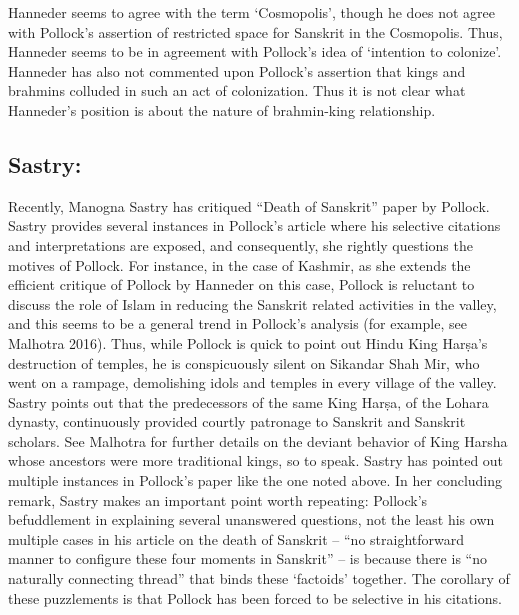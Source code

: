Hanneder seems to agree with the term ‘Cosmopolis’, though he does not agree with Pollock’s assertion of restricted space for Sanskrit in the Cosmopolis. Thus, Hanneder seems to be in agreement with Pollock’s idea of ‘intention to colonize’. Hanneder has also not commented upon Pollock’s assertion that kings and brahmins colluded in such an act of colonization. Thus it is not clear what Hanneder’s position is about the nature of brahmin-king relationship.


\newpage

\subsection*{Sastry:}

\vspace{-.3cm}

Recently, Manogna Sastry has critiqued “Death of Sanskrit” paper by Pollock. Sastry provides several instances in Pollock’s article where his selective citations and interpretations are exposed, and consequently, she rightly questions the motives of Pollock. For instance, in the case of Kashmir, as she extends the efficient critique of Pollock by Hanneder on this case, Pollock is reluctant to discuss the role of Islam in reducing the Sanskrit related activities in the valley, and this seems to be a general trend in Pollock’s analysis (for example, see Malhotra 2016). Thus, while Pollock is quick to point out Hindu King Harṣa’s destruction of temples, he is conspicuously silent on Sikandar Shah Mir, who went on a rampage, demolishing idols and temples in every village of the valley. Sastry points out that the predecessors of the same King Harṣa, of the Lohara dynasty, continuously provided courtly patronage to Sanskrit and Sanskrit scholars. See Malhotra for further details on the deviant behavior of King Harsha whose ancestors were more traditional kings, so to speak. Sastry has pointed out multiple instances in Pollock’s paper like the one noted above. In her concluding remark, Sastry makes an important point worth repeating: Pollock’s befuddlement in explaining several unanswered questions, not the least his own multiple cases in his article on the death of Sanskrit – “no straightforward manner to configure these four moments in Sanskrit” – is because there is “no naturally connecting thread” that binds these ‘factoids’ together. The corollary of these puzzlements is that Pollock has been forced to be selective in his citations.

